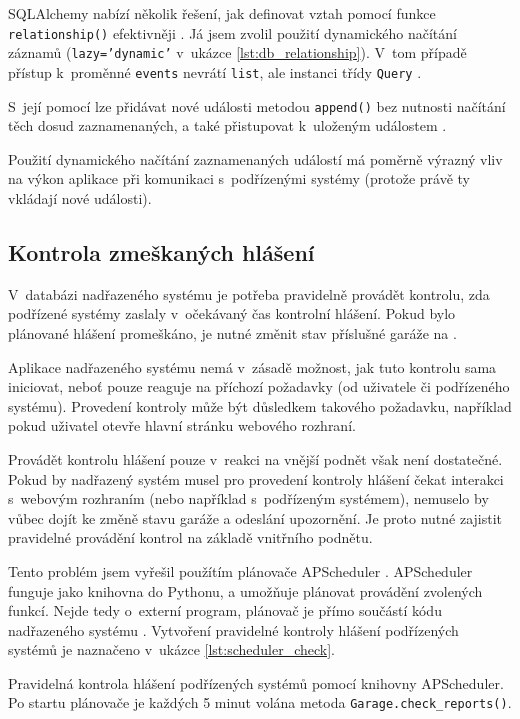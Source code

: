 SQLAlchemy nabízí několik řešení, jak definovat vztah pomocí funkce \texttt{relationship()} efektivněji \cite{sqlalchemy_col}. Já jsem zvolil použití dynamického načítání záznamů (\texttt{lazy='dynamic'} v~ukázce \ref{lst:db_relationship}). V~tom případě přístup k~proměnné \texttt{events} nevrátí \texttt{list}, ale instanci třídy \texttt{Query} \cite{sqlalchemy_col}. 

S~její pomocí lze přidávat nové události metodou \texttt{append()} bez nutnosti načítání těch dosud zaznamenaných, a také přistupovat k~uloženým událostem \cite{sqlalchemy_col}.

Použití dynamického načítání zaznamenaných událostí má poměrně výrazný vliv na výkon aplikace při komunikaci s~podřízenými systémy (protože právě ty vkládají nové události).

\subsection{Kontrola zmeškaných hlášení}
\label{sec:im_scheduler}

V~databázi nadřazeného systému je potřeba pravidelně provádět kontrolu, zda podřízené systémy zaslaly v~očekávaný čas kontrolní hlášení. Pokud bylo plánované hlášení promeškáno, je nutné změnit stav příslušné garáže na .

Aplikace nadřazeného systému nemá v~zásadě možnost, jak tuto kontrolu sama iniciovat, neboť pouze reaguje na příchozí požadavky (od uživatele či podřízeného systému). Provedení kontroly může být důsledkem takového požadavku, například pokud uživatel otevře hlavní stránku webového rozhraní. 

Provádět kontrolu hlášení pouze v~reakci na vnější podnět však není dostatečné. Pokud by nadřazený systém musel pro provedení kontroly hlášení čekat interakci s~webovým rozhraním (nebo například s~podřízeným systémem), nemuselo by vůbec dojít ke změně stavu garáže a odeslání upozornění. Je proto nutné zajistit pravidelné provádění kontrol na základě vnitřního podnětu.

Tento problém jsem vyřešil použítím plánovače APScheduler \cite{apscheduler}. APScheduler funguje jako knihovna do Pythonu, a umožňuje plánovat provádění zvolených funkcí. Nejde tedy o~externí program, plánovač je přímo součástí kódu nadřazeného systému \cite{apscheduler}. Vytvoření pravidelné kontroly hlášení podřízených systémů je naznačeno v~ukázce \ref{lst:scheduler_check}.

\begin{listing}[htbp]
\caption{\label{lst:scheduler_check} Pravidelná kontrola hlášení podřízených systémů pomocí knihovny APScheduler. Po startu plánovače je každých 5 minut volána metoda \texttt{Garage.check\_reports()}.}
\inputminted[bgcolor=codebg]{python}{source-samples/scheduler_check.py}
\end{listing}

